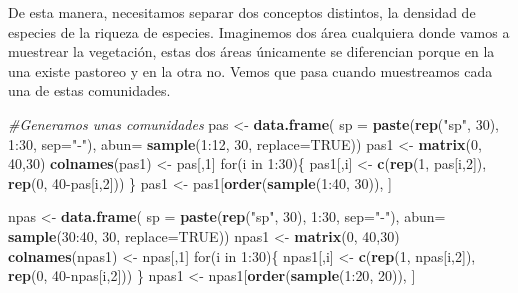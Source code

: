 \documentclass[]{book}
\newenvironment{Shaded}{\begin{snugshade}}{\end{snugshade}}
\newcommand{\KeywordTok}[1]{\textcolor[rgb]{0.13,0.29,0.53}{\textbf{{#1}}}}
\newcommand{\DataTypeTok}[1]{\textcolor[rgb]{0.13,0.29,0.53}{{#1}}}
\newcommand{\DecValTok}[1]{\textcolor[rgb]{0.00,0.00,0.81}{{#1}}}
\newcommand{\StringTok}[1]{\textcolor[rgb]{0.31,0.60,0.02}{{#1}}}
\newcommand{\CommentTok}[1]{\textcolor[rgb]{0.56,0.35,0.01}{\textit{{#1}}}}
\newcommand{\OtherTok}[1]{\textcolor[rgb]{0.56,0.35,0.01}{{#1}}}
\newcommand{\NormalTok}[1]{{#1}}
\begin{document}
De esta manera, necesitamos separar dos conceptos distintos, la densidad
de especies de la riqueza de especies. Imaginemos dos área cualquiera
donde vamos a muestrear la vegetación, estas dos áreas únicamente se
diferencian porque en la una existe pastoreo y en la otra no. Vemos que
pasa cuando muestreamos cada una de estas comunidades.

\begin{Shaded}
\begin{Highlighting}[]
\CommentTok{#Generamos unas comunidades}
\NormalTok{pas <-}\StringTok{ }\KeywordTok{data.frame}\NormalTok{( }\DataTypeTok{sp =} \KeywordTok{paste}\NormalTok{(}\KeywordTok{rep}\NormalTok{(}\StringTok{"sp"}\NormalTok{, }\DecValTok{30}\NormalTok{), }\DecValTok{1}\NormalTok{:}\DecValTok{30}\NormalTok{, }\DataTypeTok{sep=}\StringTok{"-"}\NormalTok{), }\DataTypeTok{abun=} \KeywordTok{sample}\NormalTok{(}\DecValTok{1}\NormalTok{:}\DecValTok{12}\NormalTok{, }\DecValTok{30}\NormalTok{, }\DataTypeTok{replace=}\OtherTok{TRUE}\NormalTok{))}
\NormalTok{pas1 <-}\StringTok{ }\KeywordTok{matrix}\NormalTok{(}\DecValTok{0}\NormalTok{, }\DecValTok{40}\NormalTok{,}\DecValTok{30}\NormalTok{)}
\KeywordTok{colnames}\NormalTok{(pas1) <-}\StringTok{ }\NormalTok{pas[,}\DecValTok{1}\NormalTok{]}
\NormalTok{for(i in }\DecValTok{1}\NormalTok{:}\DecValTok{30}\NormalTok{)\{}
\NormalTok{pas1[,i] <-}\StringTok{ }\KeywordTok{c}\NormalTok{(}\KeywordTok{rep}\NormalTok{(}\DecValTok{1}\NormalTok{, pas[i,}\DecValTok{2}\NormalTok{]), }\KeywordTok{rep}\NormalTok{(}\DecValTok{0}\NormalTok{, }\DecValTok{40}\NormalTok{-pas[i,}\DecValTok{2}\NormalTok{]))}
\NormalTok{\}}
\NormalTok{pas1 <-}\StringTok{ }\NormalTok{pas1[}\KeywordTok{order}\NormalTok{(}\KeywordTok{sample}\NormalTok{(}\DecValTok{1}\NormalTok{:}\DecValTok{40}\NormalTok{, }\DecValTok{30}\NormalTok{)), ]}

\NormalTok{npas <-}\StringTok{ }\KeywordTok{data.frame}\NormalTok{( }\DataTypeTok{sp =} \KeywordTok{paste}\NormalTok{(}\KeywordTok{rep}\NormalTok{(}\StringTok{"sp"}\NormalTok{, }\DecValTok{30}\NormalTok{), }\DecValTok{1}\NormalTok{:}\DecValTok{30}\NormalTok{, }\DataTypeTok{sep=}\StringTok{"-"}\NormalTok{), }\DataTypeTok{abun=} \KeywordTok{sample}\NormalTok{(}\DecValTok{30}\NormalTok{:}\DecValTok{40}\NormalTok{, }\DecValTok{30}\NormalTok{, }\DataTypeTok{replace=}\OtherTok{TRUE}\NormalTok{))}
\NormalTok{npas1 <-}\StringTok{ }\KeywordTok{matrix}\NormalTok{(}\DecValTok{0}\NormalTok{, }\DecValTok{40}\NormalTok{,}\DecValTok{30}\NormalTok{)}
\KeywordTok{colnames}\NormalTok{(npas1) <-}\StringTok{ }\NormalTok{npas[,}\DecValTok{1}\NormalTok{]}
\NormalTok{for(i in }\DecValTok{1}\NormalTok{:}\DecValTok{30}\NormalTok{)\{}
\NormalTok{npas1[,i] <-}\StringTok{ }\KeywordTok{c}\NormalTok{(}\KeywordTok{rep}\NormalTok{(}\DecValTok{1}\NormalTok{, npas[i,}\DecValTok{2}\NormalTok{]), }\KeywordTok{rep}\NormalTok{(}\DecValTok{0}\NormalTok{, }\DecValTok{40}\NormalTok{-npas[i,}\DecValTok{2}\NormalTok{]))}
\NormalTok{\}}
\NormalTok{npas1 <-}\StringTok{ }\NormalTok{npas1[}\KeywordTok{order}\NormalTok{(}\KeywordTok{sample}\NormalTok{(}\DecValTok{1}\NormalTok{:}\DecValTok{20}\NormalTok{, }\DecValTok{20}\NormalTok{)), ]}


\end{Highlighting}
\end{Shaded}
\end{document}
